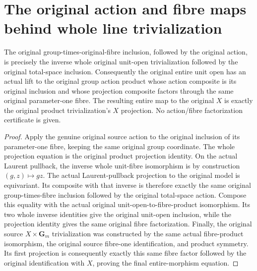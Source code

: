 \section{The original action and fibre maps behind whole line trivialization}
\label{sec:native-test-configuration-action-fibre-diagrams}

\begin{theorem}
\label{thm:native-test-configuration-action-fibre-diagrams}
\leanok
{}
The original group-times-original-fibre inclusion, followed by the
original action, is precisely the inverse whole original unit-open
trivialization followed by the original total-space inclusion.
Consequently the original entire unit open has an actual lift to
the original group action product whose action composite is its
original inclusion and whose projection composite factors through
the same original parameter-one fibre. The resulting entire map
to the original $X$ is exactly the original product trivialization's
$X$ projection. No action/fibre factorization certificate is given.
\end{theorem}

\begin{proof}
Apply the genuine original source action to the original inclusion
of its parameter-one fibre, keeping the same original group
coordinate. The whole projection equation is the original product
projection identity. On the actual Laurent pullback, the inverse
whole unit-fibre isomorphism is by construction $(g,z)\mapsto gz$.
The actual Laurent-pullback projection to the original model is
equivariant. Its composite with that inverse is therefore exactly
the same original group-times-fibre inclusion followed by the
original total-space action. Compose this equality with the
actual original unit-open-to-fibre-product isomorphism. Its two
whole inverse identities give the original unit-open inclusion,
while the projection identity gives the same original fibre
factorization. Finally, the original source $X\times\mathbf G_m$
trivialization was constructed by the same actual fibre-product
isomorphism, the original source fibre-one identification, and
product symmetry. Its first projection is consequently exactly
this same fibre factor followed by the original identification
with $X$, proving the final entire-morphism equation.
\end{proof}
